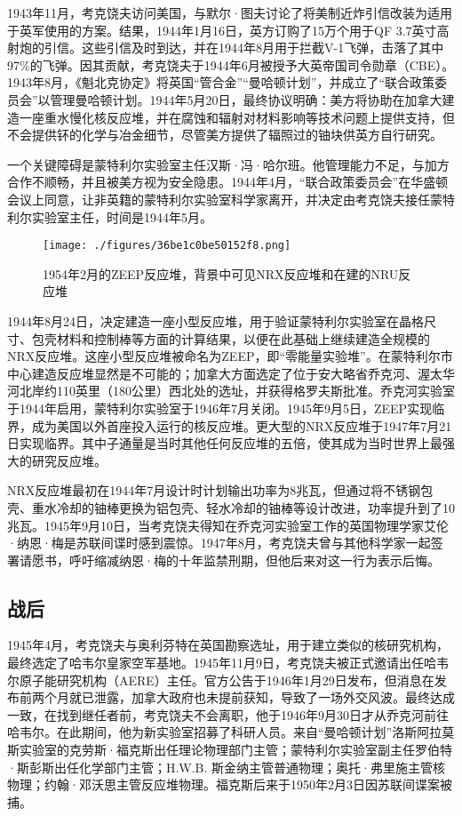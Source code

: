 1943年11月，考克饶夫访问美国，与默尔·图夫讨论了将美制近炸引信改装为适用于英军使用的方案。结果，1944年1月16日，英方订购了15万个用于QF 3.7英寸高射炮的引信。这些引信及时到达，并在1944年8月用于拦截V-1飞弹，击落了其中97\%的飞弹。因其贡献，考克饶夫于1944年6月被授予大英帝国司令勋章（CBE）。1943年8月，《魁北克协定》将英国“管合金”“曼哈顿计划”，并成立了“联合政策委员会”以管理曼哈顿计划。1944年5月20日，最终协议明确：美方将协助在加拿大建造一座重水慢化核反应堆，并在腐蚀和辐射对材料影响等技术问题上提供支持，但不会提供钚的化学与冶金细节，尽管美方提供了辐照过的铀块供英方自行研究。

一个关键障碍是蒙特利尔实验室主任汉斯·冯·哈尔班。他管理能力不足，与加方合作不顺畅，并且被美方视为安全隐患。1944年4月，“联合政策委员会”在华盛顿会议上同意，让非英籍的蒙特利尔实验室科学家离开，并决定由考克饶夫接任蒙特利尔实验室主任，时间是1944年5月。
\begin{figure}[ht]
\centering
\texttt{[image: ./figures/36be1c0be50152f8.png]}
\caption{1954年2月的ZEEP反应堆，背景中可见NRX反应堆和在建的NRU反应堆} \label{fig_YHkrf_6}
\end{figure}
1944年8月24日，决定建造一座小型反应堆，用于验证蒙特利尔实验室在晶格尺寸、包壳材料和控制棒等方面的计算结果，以便在此基础上继续建造全规模的NRX反应堆。这座小型反应堆被命名为ZEEP，即“零能量实验堆”。在蒙特利尔市中心建造反应堆显然是不可能的；加拿大方面选定了位于安大略省乔克河、渥太华河北岸约110英里（180公里）西北处的选址，并获得格罗夫斯批准。乔克河实验室于1944年启用，蒙特利尔实验室于1946年7月关闭。1945年9月5日，ZEEP实现临界，成为美国以外首座投入运行的核反应堆。更大型的NRX反应堆于1947年7月21日实现临界。其中子通量是当时其他任何反应堆的五倍，使其成为当时世界上最强大的研究反应堆。

NRX反应堆最初在1944年7月设计时计划输出功率为8兆瓦，但通过将不锈钢包壳、重水冷却的铀棒更换为铝包壳、轻水冷却的铀棒等设计改进，功率提升到了10兆瓦。1945年9月10日，当考克饶夫得知在乔克河实验室工作的英国物理学家艾伦·纳恩·梅是苏联间谍时感到震惊。1947年8月，考克饶夫曾与其他科学家一起签署请愿书，呼吁缩减纳恩·梅的十年监禁刑期，但他后来对这一行为表示后悔。
\subsection{战后}
1945年4月，考克饶夫与奥利芬特在英国勘察选址，用于建立类似的核研究机构，最终选定了哈韦尔皇家空军基地。1945年11月9日，考克饶夫被正式邀请出任哈韦尔原子能研究机构（AERE）主任。官方公告于1946年1月29日发布，但消息在发布前两个月就已泄露，加拿大政府也未提前获知，导致了一场外交风波。最终达成一致，在找到继任者前，考克饶夫不会离职，他于1946年9月30日才从乔克河前往哈韦尔。在此期间，他为新实验室招募了科研人员。来自“曼哈顿计划”洛斯阿拉莫斯实验室的克劳斯·福克斯出任理论物理部门主管；蒙特利尔实验室副主任罗伯特·斯彭斯出任化学部门主管；H.W.B. 斯金纳主管普通物理；奥托·弗里施主管核物理；约翰·邓沃思主管反应堆物理。福克斯后来于1950年2月3日因苏联间谍案被捕。

